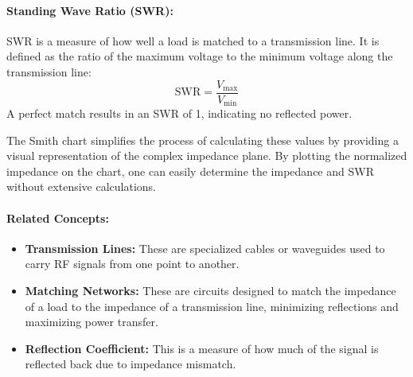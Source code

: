 \paragraph{Standing Wave Ratio (SWR):} SWR is a measure of how well a load is matched to a transmission line. It is defined as the ratio of the maximum voltage to the minimum voltage along the transmission line:
\[
\text{SWR} = \frac{V_{\text{max}}}{V_{\text{min}}}
\]
A perfect match results in an SWR of 1, indicating no reflected power.

The Smith chart simplifies the process of calculating these values by providing a visual representation of the complex impedance plane. By plotting the normalized impedance on the chart, one can easily determine the impedance and SWR without extensive calculations.

\paragraph{Related Concepts:}
\begin{itemize}
    \item \textbf{Transmission Lines:} These are specialized cables or waveguides used to carry RF signals from one point to another.
    \item \textbf{Matching Networks:} These are circuits designed to match the impedance of a load to the impedance of a transmission line, minimizing reflections and maximizing power transfer.
    \item \textbf{Reflection Coefficient:} This is a measure of how much of the signal is reflected back due to impedance mismatch.
\end{itemize}

